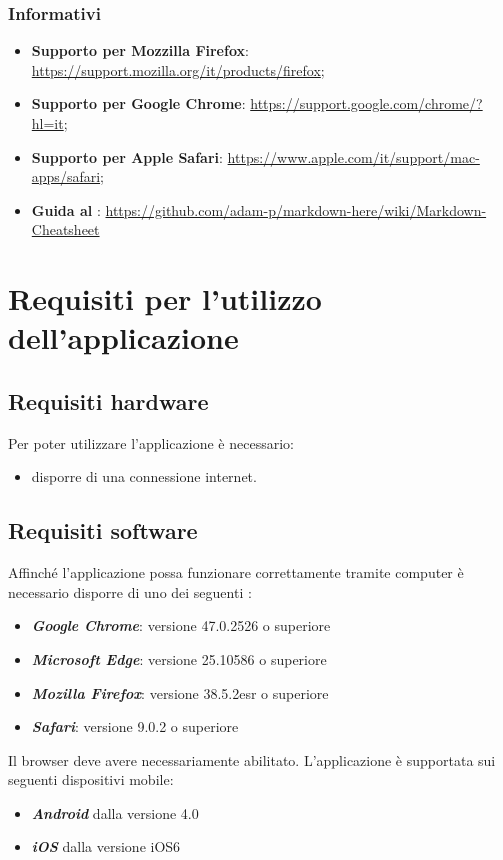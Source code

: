 \documentclass[12pt,a4paper]{article}
\begin{document}
\subsubsection{Informativi}
\begin{itemize}
	\item \textbf{Supporto per Mozzilla Firefox}: \url{https://support.mozilla.org/it/products/firefox};
	\item \textbf{Supporto per Google Chrome}: \url{https://support.google.com/chrome/?hl=it};
	\item \textbf{Supporto per Apple Safari}: \url{https://www.apple.com/it/support/mac-apps/safari};
	\item \textbf{Guida al }: \url{https://github.com/adam-p/markdown-here/wiki/Markdown-Cheatsheet}
\end{itemize}

	\newpage
	\section{Requisiti per l'utilizzo dell'applicazione} 
	\subsection{Requisiti hardware}
	Per poter utilizzare l'applicazione \prj{} è necessario:
	\begin{itemize}
		\item disporre di una connessione internet.
	\end{itemize}
	\subsection{Requisiti software}
	
	Affinché l’applicazione possa funzionare correttamente tramite computer  è necessario disporre di uno dei seguenti :
	\begin{itemize}
		\item \textit{\textbf{Google Chrome}}: versione  47.0.2526 o superiore
		\item \textit{\textbf{Microsoft Edge}}: versione 25.10586 o superiore
	\item \textit{\textbf{Mozilla Firefox}}: versione 38.5.2esr o superiore
	\item\textit{\textbf{Safari}}: versione 9.0.2 o superiore
	\end{itemize}
Il browser deve avere necessariamente  abilitato.  L'applicazione è supportata sui seguenti dispositivi mobile:
	\begin{itemize}
	\item \textit{\textbf{Android}} dalla versione 4.0
	\item \textit{\textbf{iOS}} dalla versione iOS6
\end{itemize}
\end{document}
